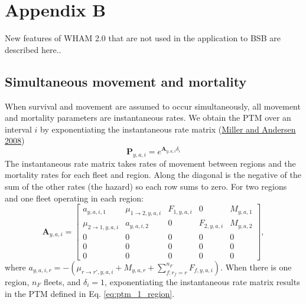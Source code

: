 \documentclass[
]{article}
\begin{document}
\setcounter{table}{0}
\renewcommand\thetable{A\arabic{table}}


\hypertarget{appendix-b}{%
\section*{Appendix B}\label{appendix-b}}

New features of WHAM 2.0 that are not used in the application to BSB are described here..

\hypertarget{simultaneous-movement-and-mortality}{%
\subsection*{Simultaneous movement and mortality}\label{simultaneous-movement-and-mortality}}

When survival and movement are assumed to occur simultaneously, all movement and mortality parameters are instantaneous rates. We obtain the PTM over an interval \(i\) by exponentiating the instantaneous rate matrix (\protect\hyperlink{ref-millerandersen08}{Miller and Andersen 2008})
\begin{equation*}
\mathbf{P}_{y,a,i} = e^{\mathbf{A}_{y,a,i}\delta_i}
\end{equation*}
The instantaneous rate matrix takes rates of movement between regions and the mortality rates for each fleet and region. Along the diagonal is the negative of the sum of the other rates (the hazard) so each row sums to zero. For two regions and one fleet operating in each region:
\begin{equation*}
 \mathbf{A}_{y,a,i} = \begin{bmatrix}
 a_{y,a,i,1} & \mu_{1\rightarrow 2,y,a,i} & F_{1,y,a,i} & 0 & M_{y,a,1} \\
 \mu_{2\rightarrow 1,y,a,i} &  a_{y,a,i,2} & 0 & F_{2,y,a,i} & M_{y,a,2} \\
 0 & 0 & 0 & 0 & 0 \\
 0 & 0 & 0 & 0 & 0 \\
 0 & 0 & 0 & 0 & 0
 \end{bmatrix},
\end{equation*}
where \(a_{y,a,i,r} = -(\mu_{r\rightarrow r',y,a,i} + M_{y,a,r} + \sum^{n_F}_{f:r_f=r}F_{f,y,a,i})\). When there is one region, \(n_F\) fleets, and \(\delta_i = 1\), exponentiating the instantaneous rate matrix results in the PTM defined in Eq. \ref{eq:ptm_1_region}.
\end{document}
